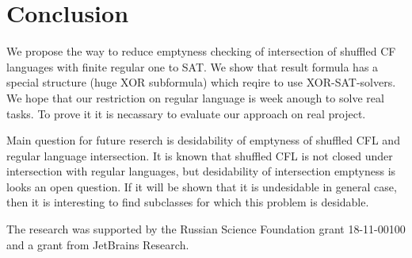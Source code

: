 




\section{Conclusion}

We propose the way to reduce emptyness checking of intersection of shuffled CF languages with finite regular one to SAT.
We show that result formula has a special structure (huge XOR subformula) which reqire to use XOR-SAT-solvers.
We hope that our restriction on regular language is week anough to solve real tasks.
To prove it it is necassary to evaluate our approach on real project.

Main question for future reserch is desidability of emptyness of shuffled CFL and regular language intersection.
It is known that shuffled CFL is not closed under intersection with regular languages, but desidability of intersection emptyness is looks an open question.
If it will be shown that it is undesidable in general case, then it is interesting to find subclasses for which this problem is desidable.



\begin{acks}
The research was supported by the Russian Science Foundation grant 18-11-00100 and a grant from JetBrains Research.   
\end{acks}
